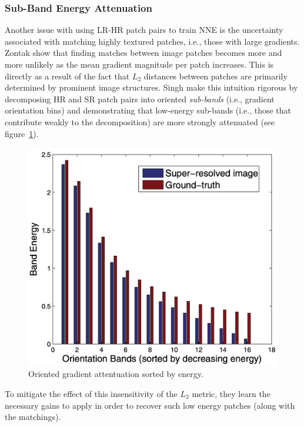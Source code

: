 \subsubsection{Sub-Band Energy Attenuation}\label{subsubsec:subband}
Another issue with using LR-HR patch pairs to train NNE is the uncertainty associated with matching highly textured patches, i.e., those with large gradients.
%
Zontak \etal\cite{zontak2011internal} show that finding matches between image patches becomes more and more unlikely as the mean gradient magnitude per patch increases.
%
This is directly as a result of the fact that \(L_2\) distances between patches are primarily determined by prominent image structures.
%
Singh \etal\cite{singh2014} make this intuition rigorous by decomposing HR and SR patch pairs into oriented \textit{sub-bands} (i.e., gradient orientation bins) and demonstrating that low-energy sub-bands (i.e., those that contribute weakly to the decomposition) are more strongly attenuated (see figure~\ref{fig:subbands}).
\begin{figure}
    \centering
    \begin{adjustbox}{width=\linewidth}
        \centering
        \includegraphics{figures/classical/subbands.png}
    \end{adjustbox}
    \caption{Oriented gradient attentuation sorted by energy\cite{singh2014}.}\label{fig:subbands}
\end{figure}
To mitigate the effect of this insensitivity of the \(L_2\) metric, they learn the necessary gains to apply in order to recover such low energy patches (along with the matchings).

